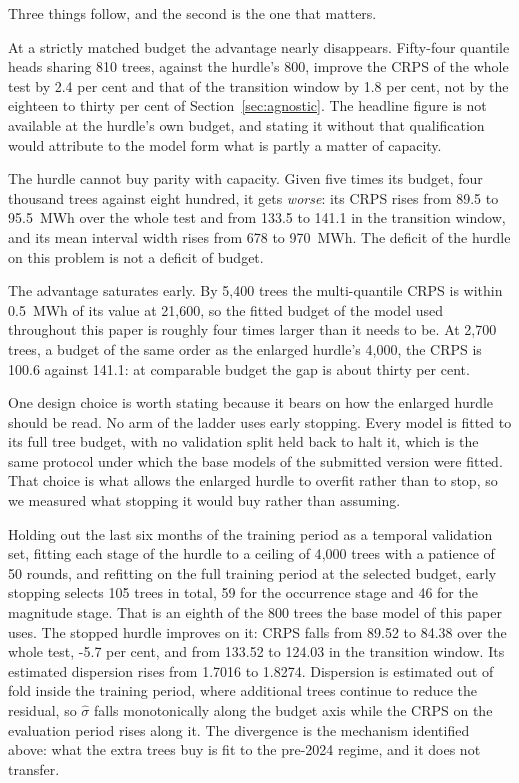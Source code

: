 \documentclass[preprint,3p,times]{elsarticle}
\begin{document}


Three things follow, and the second is the one that matters.

At a strictly matched budget the advantage nearly disappears. Fifty-four quantile heads sharing 810 trees, against the hurdle's 800, improve the CRPS of the whole test by 2.4 per cent and that of the transition window by 1.8 per cent, not by the eighteen to thirty per cent of Section~\ref{sec:agnostic}. The headline figure is not available at the hurdle's own budget, and stating it without that qualification would attribute to the model form what is partly a matter of capacity.

The hurdle cannot buy parity with capacity. Given five times its budget, four thousand trees against eight hundred, it gets \emph{worse}: its CRPS rises from 89.5 to 95.5~MWh over the whole test and from 133.5 to 141.1 in the transition window, and its mean interval width rises from 678 to 970~MWh. The deficit of the hurdle on this problem is not a deficit of budget.

The advantage saturates early. By 5{,}400 trees the multi-quantile CRPS is within 0.5~MWh of its value at 21{,}600, so the fitted budget of the model used throughout this paper is roughly four times larger than it needs to be. At 2{,}700 trees, a budget of the same order as the enlarged hurdle's 4{,}000, the CRPS is 100.6 against 141.1: at comparable budget the gap is about thirty per cent.

One design choice is worth stating because it bears on how the enlarged hurdle should be read. No arm of the ladder uses early stopping. Every model is fitted to its full tree budget, with no validation split held back to halt it, which is the same protocol under which the base models of the submitted version were fitted. That choice is what allows the enlarged hurdle to overfit rather than to stop, so we measured what stopping it would buy rather than assuming.

Holding out the last six months of the training period as a temporal validation set, fitting each stage of the hurdle to a ceiling of 4{,}000 trees with a patience of 50 rounds, and refitting on the full training period at the selected budget, early stopping selects 105 trees in total, 59 for the occurrence stage and 46 for the magnitude stage. That is an eighth of the 800 trees the base model of this paper uses. The stopped hurdle improves on it: CRPS falls from 89.52 to 84.38 over the whole test, -5.7 per cent, and from 133.52 to 124.03 in the transition window. Its estimated dispersion rises from 1.7016 to 1.8274. Dispersion is estimated out of fold inside the training period, where additional trees continue to reduce the residual, so $\hat\sigma$ falls monotonically along the budget axis while the CRPS on the evaluation period rises along it. The divergence is the mechanism identified above: what the extra trees buy is fit to the pre-2024 regime, and it does not transfer.
\end{document}
